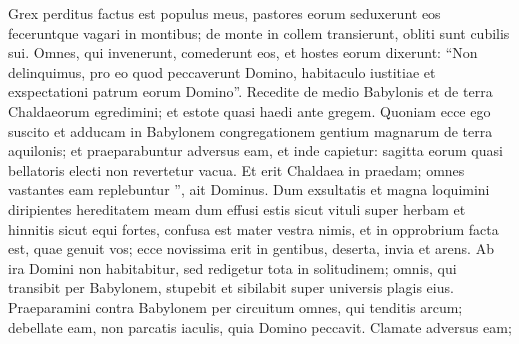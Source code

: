 \begin{biblechapter}
\begin{biblechapter}
\begin{biblechapter}
\begin{biblechapter}
\begin{biblechapter}
\begin{biblechapter}
\begin{biblechapter}
\begin{biblechapter}
\begin{biblechapter}
\begin{biblechapter}
\begin{biblechapter}
\begin{biblechapter}
\begin{biblechapter}
\begin{biblechapter}
\begin{biblechapter}
\begin{biblechapter}
\begin{biblechapter}
\begin{biblechapter}
\begin{biblechapter}
\begin{biblechapter}
\begin{biblechapter}
\begin{biblechapter}
\begin{biblechapter}
\begin{biblechapter}
\begin{biblechapter}
\begin{biblechapter}
\begin{biblechapter}
\begin{biblechapter}
\begin{biblechapter}
\begin{biblechapter}
\begin{biblechapter}
\begin{biblechapter}
\begin{biblechapter}
\begin{biblechapter}
\begin{biblechapter}
\begin{biblechapter}
\begin{biblechapter}
\begin{biblechapter}
\begin{biblechapter}
\begin{biblechapter}
\begin{biblechapter}
\begin{biblechapter}
\begin{biblechapter}
\begin{biblechapter}
\begin{biblechapter}
\begin{biblechapter}
\begin{biblechapter}
\begin{biblechapter}
\begin{biblechapter}
\begin{biblechapter}
\verse Grex perditus factus est populus meus, pastores eorum seduxerunt eos feceruntque vagari in montibus; de monte in collem transierunt, obliti sunt cubilis sui. 
\verse Omnes, qui invenerunt, comederunt eos, et hostes eorum dixerunt: “Non delinquimus, pro eo quod peccaverunt Domino, habitaculo iustitiae et exspectationi patrum eorum Domino”.
 \verse Recedite de medio Babylonis
 et de terra Chaldaeorum egredimini;
 et estote quasi haedi ante gregem.
 \verse Quoniam ecce ego suscito et adducam in Babylonem
 congregationem gentium magnarum
 de terra aquilonis;
 et praeparabuntur adversus eam,
 et inde capietur:
 sagitta eorum quasi bellatoris electi
 non revertetur vacua.
 \verse Et erit Chaldaea in praedam;
 omnes vastantes eam replebuntur ”,
 ait Dominus.
 \verse Dum exsultatis et magna loquimini
 diripientes hereditatem meam
 dum effusi estis sicut vituli super herbam
 et hinnitis sicut equi fortes,
 \verse confusa est mater vestra nimis,
 et in opprobrium facta est, quae genuit vos;
 ecce novissima erit in gentibus,
 deserta, invia et arens.
 \verse Ab ira Domini non habitabitur,
 sed redigetur tota in solitudinem;
 omnis, qui transibit per Babylonem, stupebit
 et sibilabit super universis plagis eius.
 \verse Praeparamini contra Babylonem per circuitum
 omnes, qui tenditis arcum;
 debellate eam, non parcatis iaculis,
 quia Domino peccavit.
 \verse Clamate adversus eam;

\end{biblechapter}
\end{biblechapter}
\end{biblechapter}
\end{biblechapter}
\end{biblechapter}
\end{biblechapter}
\end{biblechapter}
\end{biblechapter}
\end{biblechapter}
\end{biblechapter}
\end{biblechapter}
\end{biblechapter}
\end{biblechapter}
\end{biblechapter}
\end{biblechapter}
\end{biblechapter}
\end{biblechapter}
\end{biblechapter}
\end{biblechapter}
\end{biblechapter}
\end{biblechapter}
\end{biblechapter}
\end{biblechapter}
\end{biblechapter}
\end{biblechapter}
\end{biblechapter}
\end{biblechapter}
\end{biblechapter}
\end{biblechapter}
\end{biblechapter}
\end{biblechapter}
\end{biblechapter}
\end{biblechapter}
\end{biblechapter}
\end{biblechapter}
\end{biblechapter}
\end{biblechapter}
\end{biblechapter}
\end{biblechapter}
\end{biblechapter}
\end{biblechapter}
\end{biblechapter}
\end{biblechapter}
\end{biblechapter}
\end{biblechapter}
\end{biblechapter}
\end{biblechapter}
\end{biblechapter}
\end{biblechapter}
\end{biblechapter}
